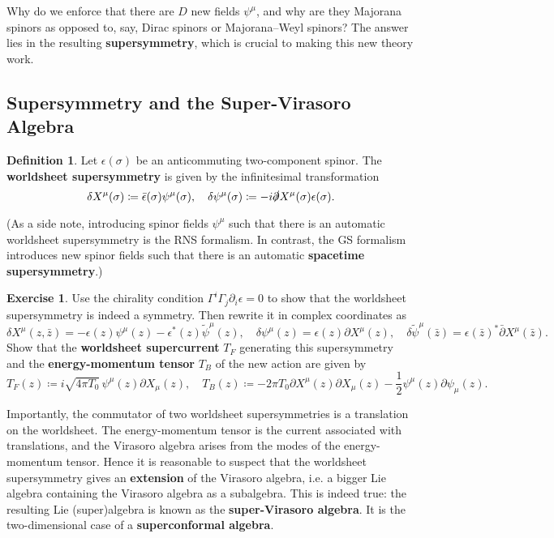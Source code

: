 \documentclass{report}
\theoremstyle{plain}
\theoremstyle{definition}
\newtheorem{definition}[theorem]{Definition}
\newtheorem{exercise}{Exercise}[section]
\theoremstyle{remark}
\newcommand{\di}{\partial}
\newcommand{\bz}{\bar{z}}
\newcommand{\bdi}{\bar{\di}}
\begin{document}
Why do we enforce that there are $D$ new fields $\psi^\mu$, and why
are they Majorana spinors as opposed to, say, Dirac spinors or
Majorana--Weyl spinors? The answer lies in the resulting {\bf
  supersymmetry}, which is crucial to making this new theory work.

\subsection{Supersymmetry and the Super-Virasoro Algebra}

\begin{definition}
  Let $\epsilon(\sigma)$ be an anticommuting two-component spinor. The
  {\bf worldsheet supersymmetry} is given by the infinitesimal
  transformation
  \[ \delta X^\mu(\sigma) \coloneqq \bar{\epsilon}(\sigma) \psi^\mu(\sigma), \quad \delta \psi^\mu(\sigma) \coloneqq -i \slashed{\di} X^\mu(\sigma) \epsilon(\sigma). \]
\end{definition}

(As a side note, introducing spinor fields $\psi^\mu$ such that there
is an automatic worldsheet supersymmetry is the RNS formalism. In
contrast, the GS formalism introduces new spinor fields such that
there is an automatic {\bf spacetime supersymmetry}.)

\begin{exercise}
  Use the chirality condition $\Gamma^i \Gamma_j \di_i \epsilon = 0$
  to show that the worldsheet supersymmetry is indeed a symmetry. Then
  rewrite it in complex coordinates as
  \[ \delta X^\mu(z, \bz) = -\epsilon(z) \psi^\mu(z) - \epsilon^*(z) \tilde{\psi}^\mu(z), \quad \delta \psi^\mu(z) = \epsilon(z) \di X^\mu(z), \quad \delta \tilde{\psi}^\mu(\bz) = \epsilon(\bz)^* \bdi X^\mu(\bz). \]
  Show that the {\bf worldsheet supercurrent} $T_F$ generating this
  supersymmetry and the {\bf energy-momentum tensor} $T_B$
  of the new action are given by
  \[ T_F(z) \coloneqq i\sqrt{4\pi T_0} \, \psi^\mu(z) \di X_\mu(z), \quad T_B(z) \coloneqq -2\pi T_0 \di X^\mu(z) \di X_\mu(z) - \frac{1}{2} \psi^\mu(z) \di \psi_\mu(z). \]
\end{exercise}

Importantly, the commutator of two worldsheet supersymmetries is a
translation on the worldsheet. The energy-momentum tensor is the
current associated with translations, and the Virasoro algebra arises
from the modes of the energy-momentum tensor. Hence it is reasonable
to suspect that the worldsheet supersymmetry gives an {\bf extension}
of the Virasoro algebra, i.e. a bigger Lie algebra containing the
Virasoro algebra as a subalgebra. This is indeed true: the resulting
Lie (super)algebra is known as the {\bf super-Virasoro algebra}. It is
the two-dimensional case of a {\bf superconformal algebra}.
\end{document}
